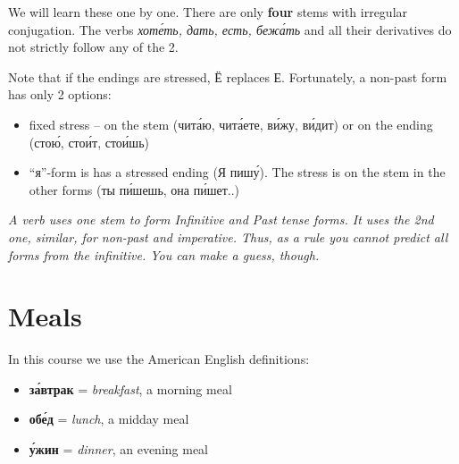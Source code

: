 We will learn these one by one. There are only \textbf{four} stems with
irregular conjugation. The verbs \emph{хот\'{е}ть, дать, есть, беж\'{а}ть} and
all their derivatives do not strictly follow any of the 2.

Note that if the endings are stressed, Ё replaces Е. Fortunately, a
non-past form has only 2 options:

\begin{itemize}
\tightlist
\item
  fixed stress -- on the stem (чит\'{а}ю, чит\'{а}ете, в\'{и}жу, в\'{и}дит) or on the
  ending (сто\'{ю}, сто\'{и}т, сто\'{и}шь)
\item
  ``я''-form is has a stressed ending (Я пиш\'{у}). The stress is on the
  stem in the other forms (ты п\'{и}шешь, она п\'{и}шет..)
\end{itemize}

\emph{A verb uses one stem to form Infinitive and Past tense forms. It
uses the 2nd one, similar, for non-past and imperative. Thus, as a rule
you cannot predict all forms from the infinitive. You can make a guess,
though.}

\section{Meals}\label{meals}

In this course we use the American English definitions:

\begin{itemize}
\tightlist
\item
  \textbf{з\'{а}втрак} = \emph{breakfast}, a morning meal
\item
  \textbf{об\'{е}д} = \emph{lunch}, a midday meal
\item
  \textbf{\'{у}жин} = \emph{dinner}, an evening meal
\end{itemize}
